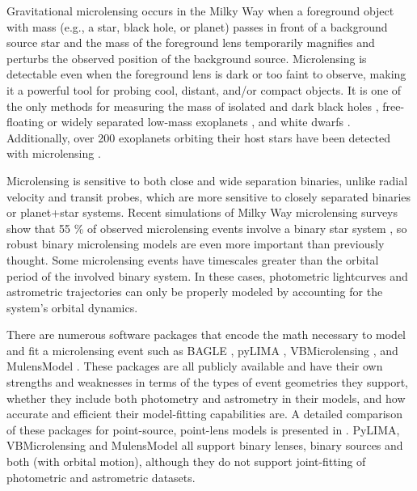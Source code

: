 \documentclass[twocolumn]{aastex701}
\begin{document}
Gravitational microlensing occurs in the Milky Way when a foreground object with mass (e.g., a star, black hole, or planet) passes in front of a background source star and the mass of the foreground lens temporarily magnifies and perturbs the observed position of the background source. 
Microlensing is detectable even when the foreground lens is dark or too faint to observe, making it a powerful tool for probing cool, distant, and/or compact objects. It is one of the only methods for measuring the mass of isolated and dark black holes \citep{Lam:2022, Sahu:2022, Mroz:2022, Lam:2023-OB110462, Sahu2025}, free-floating or widely separated low-mass exoplanets \citep{Gaudi2012}, and white dwarfs \citep{Sahu2017, McGill2023}. Additionally, over 200 exoplanets orbiting their host stars have been detected with microlensing \citep{Mroz_2024}.

Microlensing is sensitive to both close and wide separation binaries, unlike radial velocity and transit probes, which are more sensitive to closely separated binaries or planet+star systems.
Recent simulations of Milky Way microlensing surveys show that 55 \% of observed microlensing events involve a binary star system \citep{Natasha_2025}, so robust binary microlensing models are even more important than previously thought. 
Some microlensing events have timescales greater than the orbital period of the involved binary system. In these cases, photometric lightcurves and astrometric trajectories can only be properly modeled by accounting for the system's orbital dynamics.

There are numerous software packages that encode the math necessary to model and fit a microlensing event such as 
BAGLE \citep{Lu:2025},
pyLIMA \citep{Bachelet2017}, VBMicrolensing \citep{Bozza2010,Bozza2018,Bozza2021,Bozza2024}, and MulensModel \citep{Poleski2019}.
These packages are all publicly available and have their own strengths and weaknesses in terms of the types of event geometries they support, whether they include both photometry and astrometry in their models, and how accurate and efficient their model-fitting capabilities are. A detailed comparison of these packages for point-source, point-lens models is presented in \citep{Lu:2025}. PyLIMA, VBMicrolensing and MulensModel all support binary lenses, binary sources and both (with orbital motion), although they do not support joint-fitting of photometric and astrometric datasets. 

\end{document}
